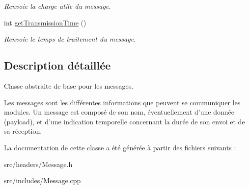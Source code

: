 \begin{DoxyCompactItemize}
\begin{DoxyCompactList}\small\item\em Renvoie la charge utile du message. \end{DoxyCompactList}\item 
\hypertarget{classMessage_a37550fee6e64d7c83ead2628373f4db3}{int \hyperlink{classMessage_a37550fee6e64d7c83ead2628373f4db3}{get\-Transmission\-Time} ()}\label{classMessage_a37550fee6e64d7c83ead2628373f4db3}

\begin{DoxyCompactList}\small\item\em Renvoie le temps de traitement du message. \end{DoxyCompactList}\end{DoxyCompactItemize}


\subsection{Description détaillée}
Classe abstraite de base pour les messages. 

Les messages sont les différentes informations que peuvent se communiquer les modules. Un message est composé de son nom, éventuellement d'une donnée (payload), et d'une indication temporelle concernant la durée de son envoi et de sa réception. 

La documentation de cette classe a été générée à partir des fichiers suivants \-:\begin{DoxyCompactItemize}
\item 
src/headers/Message.\-h\item 
src/includes/Message.\-cpp\end{DoxyCompactItemize}
